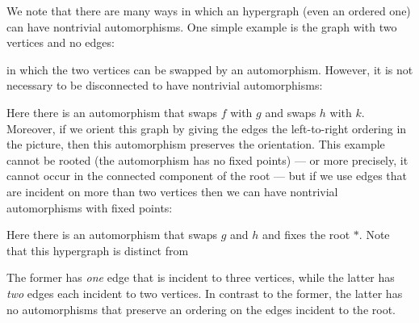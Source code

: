 \documentclass{article}
\theoremstyle{definition}
\theoremstyle{remark}
\begin{document}
We note that there are many ways in which an hypergraph (even an ordered one) can have nontrivial automorphisms.
One simple example is the graph with two vertices and no edges:
\begin{center}
\end{center}
in which the two vertices can be swapped by an automorphism.
However, it is not necessary to be disconnected to have nontrivial automorphisms:
\begin{center}
\end{center}
Here there is an automorphism that swaps $f$ with $g$ and swaps $h$ with $k$.
Moreover, if we orient this graph by giving the edges the left-to-right ordering in the picture, then this automorphism preserves the orientation.
This example cannot be rooted (the automorphism has no fixed points) --- or more precisely, it cannot occur in the connected component of the root --- but if we use edges that are incident on more than two vertices then we can have nontrivial automorphisms with fixed points:
\begin{center}
\end{center}
Here there is an automorphism that swaps $g$ and $h$ and fixes the root $\ast$.
Note that this hypergraph is distinct from
\begin{center}
\end{center}
The former has \emph{one} edge that is incident to three vertices, while the latter has \emph{two} edges each incident to two vertices.
In contrast to the former, the latter has no automorphisms that preserve an ordering on the edges incident to the root.
\end{document}

